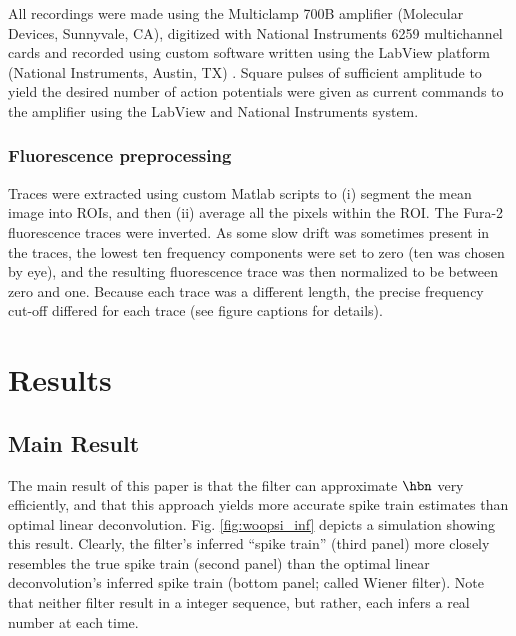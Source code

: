 All recordings were made using the Multiclamp 700B amplifier (Molecular Devices, Sunnyvale, CA), digitized with National Instruments 6259 multichannel cards and recorded using custom software written using the LabView platform (National Instruments, Austin, TX) .  Square pulses of sufficient amplitude to yield the desired number of action potentials were given as current commands to the amplifier using the LabView and National Instruments system.

\subsubsection{Fluorescence preprocessing}

Traces were extracted using custom Matlab scripts to (i) segment the mean image into ROIs, and then (ii) average all the pixels within the ROI.  The Fura-2 fluorescence traces were inverted.  As some slow drift was sometimes present in the traces, the lowest ten frequency components were set to zero (ten was chosen by eye), and the resulting fluorescence trace was then normalized to be between zero and one.  Because each trace was a different length, the precise frequency cut-off differed for each trace (see figure captions for details).









\section{Results} \label{sec:results}

\subsection{Main Result} \label{sec:main}

The main result of this paper is that the \foopsi filter can approximate $\hbn$ very efficiently, and that this approach yields more accurate spike train estimates than optimal linear deconvolution.  Fig. \ref{fig:woopsi_inf} depicts a simulation showing this result. Clearly, the \foopsi filter's inferred ``spike train'' (third panel) more closely resembles the true spike train (second panel) than the optimal linear deconvolution's inferred spike train (bottom panel;  called  Wiener filter).  Note that neither filter result in a integer sequence, but rather, each infers a real number at each time.

